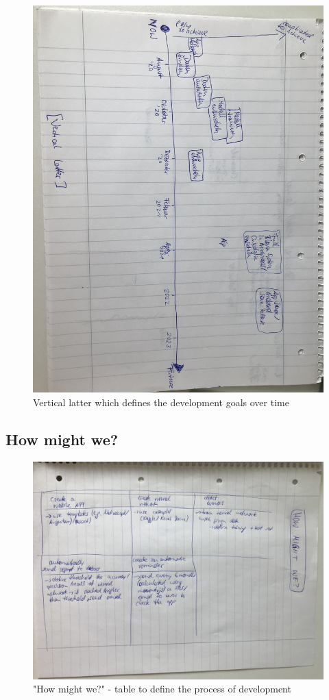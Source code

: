 \begin{figure}[h!]
	\centering
	\includegraphics[width=1\textwidth]{images/verticallatter.jpg}
	\caption{Vertical latter which defines the development goals over time}
	\label{verticallatter}
\end{figure}

\subsection{How might we?}

\begin{figure}[h!]
	\centering
	\includegraphics[width=1\textwidth]{images/howmightwe.jpg}
	\caption{"How might we?" - table to define the process of development}
	\label{howmightwe}
\end{figure}

